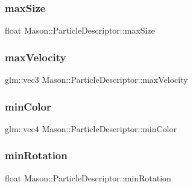 \subsubsection{\texorpdfstring{max\+Size}{maxSize}}
{\footnotesize\ttfamily float Mason\+::\+Particle\+Descriptor\+::max\+Size}

\hypertarget{class_mason_1_1_particle_descriptor_afc679429239c6e9c40b5c2e75228e2c1}{}\label{class_mason_1_1_particle_descriptor_afc679429239c6e9c40b5c2e75228e2c1} 
\subsubsection{\texorpdfstring{max\+Velocity}{maxVelocity}}
{\footnotesize\ttfamily glm\+::vec3 Mason\+::\+Particle\+Descriptor\+::max\+Velocity}

\hypertarget{class_mason_1_1_particle_descriptor_a86b3ee8f533d314ed0f0e48228144a25}{}\label{class_mason_1_1_particle_descriptor_a86b3ee8f533d314ed0f0e48228144a25} 
\subsubsection{\texorpdfstring{min\+Color}{minColor}}
{\footnotesize\ttfamily glm\+::vec4 Mason\+::\+Particle\+Descriptor\+::min\+Color}

\hypertarget{class_mason_1_1_particle_descriptor_a086f4988188e22f066e93529cb02608c}{}\label{class_mason_1_1_particle_descriptor_a086f4988188e22f066e93529cb02608c} 
\subsubsection{\texorpdfstring{min\+Rotation}{minRotation}}
{\footnotesize\ttfamily float Mason\+::\+Particle\+Descriptor\+::min\+Rotation}

\hypertarget{class_mason_1_1_particle_descriptor_a5bbc1147b832c903cee0b6ebe964d8c3}{}\label{class_mason_1_1_particle_descriptor_a5bbc1147b832c903cee0b6ebe964d8c3} 
